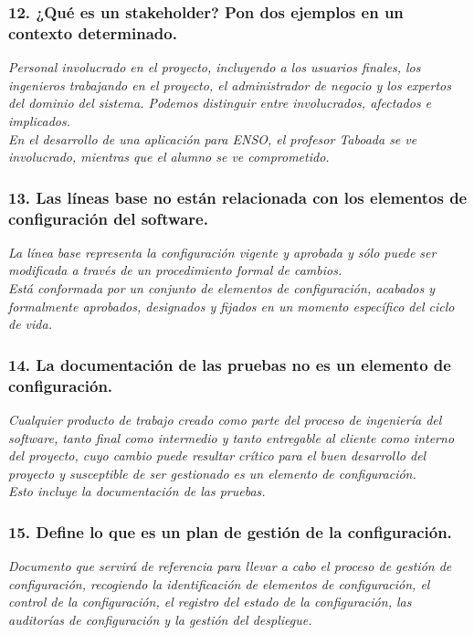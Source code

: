 \subsubsection*{12. ¿Qué es un stakeholder? Pon dos ejemplos en un contexto determinado.}
\textit{Personal involucrado en el proyecto, incluyendo a los usuarios finales, los ingenieros trabajando en el proyecto, el administrador de negocio y los expertos del dominio del sistema. Podemos distinguir entre involucrados, afectados e implicados.
\\
En el desarrollo de una aplicación para ENSO, el profesor Taboada se ve involucrado, mientras que el alumno se ve comprometido.
}

\subsubsection*{13. Las líneas base no están relacionada con los elementos de configuración del software.}
\textit{ La línea base representa la configuración vigente y aprobada y sólo puede ser modificada a través de un procedimiento formal de cambios.
\\
Está conformada por un conjunto de elementos de configuración, acabados y formalmente aprobados, designados y fijados en un momento específico del ciclo de vida.}

\subsubsection*{14. La documentación de las pruebas no es un elemento de configuración.}
\textit{Cualquier producto de trabajo creado como parte del proceso de ingeniería del software, tanto final como intermedio y tanto entregable al cliente como interno del proyecto, cuyo cambio puede resultar crítico para el buen desarrollo del proyecto y susceptible de ser gestionado es un elemento de configuración.\\
Esto incluye la documentación de las pruebas.
}

\subsubsection*{15. Define lo que es un plan de gestión de la configuración.}
\textit{Documento que servirá de referencia para llevar a cabo el proceso de gestión de configuración, recogiendo la identificación de elementos de configuración, el control de la configuración, el registro del estado de la configuración, las auditorías de configuración y la gestión del despliegue.}

